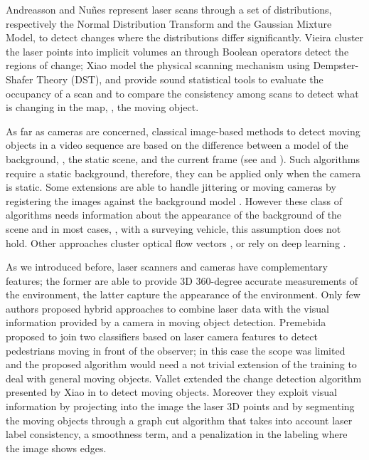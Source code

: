 Andreasson \etal \cite{andreasson2007has} and Nu{\~n}es \etal \cite{nunez2010change} represent laser scans through a set of distributions, respectively the Normal Distribution Transform and the Gaussian Mixture Model, to detect changes where the distributions differ significantly. 
Vieira \etal \cite{vieira2014spatial} cluster the laser points into implicit volumes an through Boolean operators detect the regions of change;
Xiao \etal \cite{xiao2013change} model the physical scanning mechanism using Dempster-Shafer Theory (DST), and provide sound statistical tools to evaluate the occupancy of a scan and to compare the consistency among scans to detect what is changing in the map, \ie, the moving object. %

As far as cameras are concerned, classical image-based methods to detect moving objects in a video sequence are based on the difference between a model of the background, \ie, the static scene, and the current frame (see \cite{Piccardi2004background} and \cite{Sobral2014}). 
Such algorithms require a static background, therefore, they can be applied only when the camera is static. 
Some extensions are able to handle jittering or moving cameras by registering the images against the background model \cite{azzari2005effective,romanoni2014background,kim2013detection,shakeri2014detection}.
However these class of algorithms needs information about the appearance of the background of the scene and in most cases, \eg, with a surveying vehicle, this assumption does not hold. 
Other approaches cluster optical flow vectors \cite{markovic2014moving}, or rely on deep learning \cite{lin2014deep}.

As we introduced before, laser scanners and cameras have complementary features; the former are able to provide 3D 360-degree accurate measurements of the environment, the latter capture the appearance of the environment. Only few authors proposed hybrid approaches to combine laser data with the visual information provided by a camera in moving object detection.
Premebida \etal \cite{premebida2009lidar} proposed to join two classifiers based on laser camera features to detect pedestrians moving in front of the observer; in this case the scope was limited and the proposed algorithm would need a not trivial extension of the training to deal with general moving objects.
Vallet \etal \cite{vallet2015extracting} extended the change detection algorithm presented by Xiao \etal in \cite{xiao2013change} to detect moving objects. Moreover they exploit visual information by projecting into the image the laser 3D points and by segmenting the moving objects through a graph cut algorithm that takes into account laser label consistency, a smoothness term, and a penalization in the labeling where the image shows edges. 

